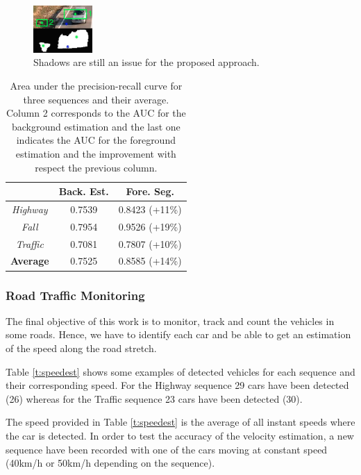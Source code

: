 \documentclass{article}
\begin{document}
\begin{figure}[!htb]
	\centering
	\includegraphics[width=0.2\textwidth]{fig/shadowProblem}
    \caption{Shadows are still an issue for the proposed approach.}
    \label{f:shadow}
\end{figure}

\begin{table}
\caption{Area under the precision-recall curve for three sequences and their average. Column 2 corresponds to the AUC for the background estimation and the last one indicates the AUC for the foreground estimation and the improvement with respect the previous column.}
\begin{center}
\begin{tabular}{c | c c}
& \textbf{Back. Est.} & \textbf{Fore. Seg.}\\
\hline
\emph{Highway} & 0.7539 & 0.8423 (+11\%)\\
\emph{Fall} & 0.7954 & 0.9526 (+19\%)\\
\emph{Traffic} & 0.7081 & 0.7807 (+10\%)\\
\textbf{Average} & 0.7525 & 0.8585 (+14\%)\\
\end{tabular}
\end{center}
\label{t:bckauc}
\end{table}

\subsubsection{Road Traffic Monitoring}

The final objective of this work is to monitor, track and count the vehicles in some roads. Hence, we have to identify each car and be able to get an estimation of the speed along the road stretch.

Table \ref{t:speedest} shows some examples of detected vehicles for each sequence and their corresponding speed. For the Highway sequence 29 cars have been detected (26) whereas for the Traffic sequence 23 cars have been detected (30).

The speed provided in Table \ref{t:speedest} is the average of all instant speeds where the car is detected. In order to test the accuracy of the velocity estimation, a new sequence have been recorded with one of the cars moving at constant speed (40km/h or 50km/h depending on the sequence).
\end{document}
